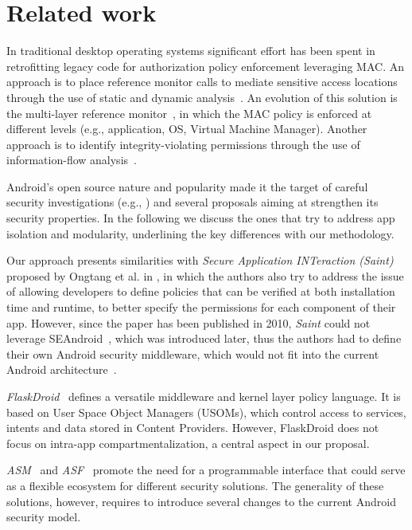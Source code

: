 \section{Related work}\label{sect:seapp_relwork}

In traditional desktop operating systems significant effort has been
spent in retrofitting legacy code for authorization policy enforcement
leveraging MAC.  An approach is to place reference monitor calls to
mediate sensitive access locations through the use of static and
dynamic analysis~\cite{seapp_jaeger_retro, seapp_jaeger_hook}.  An
evolution of this solution is the multi-layer reference
monitor~\cite{seapp_jaeger_web}, in which the MAC policy is enforced
at different levels (e.g., application, OS, Virtual Machine Manager).
Another approach is to identify integrity-violating permissions
through the use of information-flow analysis~\cite{seapp_jaeger_flow}.

Android's open source nature and popularity made it the target of
careful security investigations (e.g., \cite{seapp_sok_android,
  seapp_10.1007/978-3-319-20550-2_15, seapp_4768655,
  seapp_10.5555/2028067.2028088}) and several proposals aiming at
strengthen its security properties.  In the following we discuss the
ones that try to address app isolation and modularity, underlining the
key differences with our methodology.

Our approach presents similarities with {\em Secure Application
  INTeraction (Saint)} proposed by Ongtang et al. in
\cite{seapp_semantically_rich}, in which the authors also try to
address the issue of allowing developers to define policies that can
be verified at both installation time and runtime, to better specify
the permissions for each component of their app.  However, since the
paper has been published in 2010, {\em Saint} could not leverage
SEAndroid~\cite{seapp_seandroid}, which was introduced later, thus the
authors had to define their own Android security middleware, which
would not fit into the current Android
architecture~\cite{seapp_tapsm_m}.

{\em FlaskDroid}~\cite{seapp_flaskdroid} defines a versatile
middleware and kernel layer policy language.  It is based on User Space
Object Managers (USOMs), which control access to services, intents and
data stored in Content Providers.  However, FlaskDroid does not focus
on intra-app compartmentalization, a central aspect in our proposal.

{\em ASM}~\cite{seapp_asm} and {\em ASF}~\cite{seapp_flaskdroid2}
promote the need for a programmable interface that could serve as a
flexible ecosystem for different security solutions. The generality of
these solutions, however, requires to introduce several changes to the
current Android security model.


